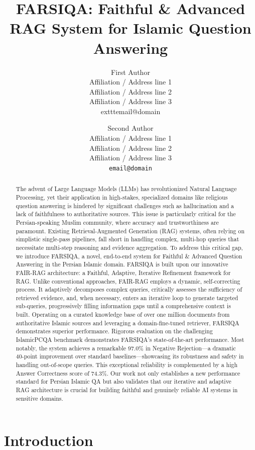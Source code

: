 \documentclass[11pt]{article}
\title{FARSIQA: Faithful \& Advanced RAG System for Islamic Question Answering}
\author{First Author \\
  Affiliation / Address line 1 \\
  Affiliation / Address line 2 \\
  Affiliation / Address line 3 \\
  	exttt{email@domain} \\\and
  Second Author \\
  Affiliation / Address line 1 \\
  Affiliation / Address line 2 \\
  Affiliation / Address line 3 \\
  \texttt{email@domain} \\}
\begin{document}
\maketitle
\begin{abstract}
The advent of Large Language Models (LLMs) has revolutionized Natural Language Processing, yet their application in high-stakes, specialized domains like religious question answering is hindered by significant challenges such as hallucination and a lack of faithfulness to authoritative sources. This issue is particularly critical for the Persian-speaking Muslim community, where accuracy and trustworthiness are paramount. Existing Retrieval-Augmented Generation (RAG) systems, often relying on simplistic single-pass pipelines, fall short in handling complex, multi-hop queries that necessitate multi-step reasoning and evidence aggregation. To address this critical gap, we introduce FARSIQA, a novel, end-to-end system for Faithful \& Advanced Question Answering in the Persian Islamic domain. FARSIQA is built upon our innovative FAIR-RAG architecture: a Faithful, Adaptive, Iterative Refinement framework for RAG. Unlike conventional approaches, FAIR-RAG employs a dynamic, self-correcting process. It adaptively decomposes complex queries, critically assesses the sufficiency of retrieved evidence, and, when necessary, enters an iterative loop to generate targeted sub-queries, progressively filling information gaps until a comprehensive context is built. Operating on a curated knowledge base of over one million documents from authoritative Islamic sources and leveraging a domain-fine-tuned retriever, FARSIQA demonstrates superior performance. Rigorous evaluation on the challenging IslamicPCQA benchmark demonstrates FARSIQA's state-of-the-art performance. Most notably, the system achieves a remarkable 97.0\% in Negative Rejection---a dramatic 40-point improvement over standard baselines---showcasing its robustness and safety in handling out-of-scope queries. This exceptional reliability is complemented by a high Answer Correctness score of 74.3\%. Our work not only establishes a new performance standard for Persian Islamic QA but also validates that our iterative and adaptive RAG architecture is crucial for building faithful and genuinely reliable AI systems in sensitive domains.
\end{abstract}

\section{Introduction}
\end{document}

